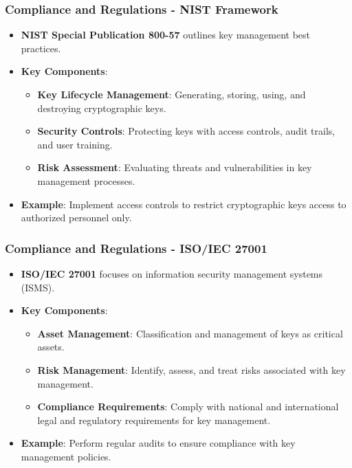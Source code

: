 \documentclass{beamer}
\begin{document}
\begin{frame}[fragile]
    \frametitle{Compliance and Regulations - NIST Framework}
    \begin{itemize}
        \item \textbf{NIST Special Publication 800-57} outlines key management best practices.
        \item \textbf{Key Components}:
        \begin{itemize}
            \item \textbf{Key Lifecycle Management}: Generating, storing, using, and destroying cryptographic keys.
            \item \textbf{Security Controls}: Protecting keys with access controls, audit trails, and user training.
            \item \textbf{Risk Assessment}: Evaluating threats and vulnerabilities in key management processes.
        \end{itemize}
        \item \textbf{Example}: Implement access controls to restrict cryptographic keys access to authorized personnel only.
    \end{itemize}
\end{frame}

\begin{frame}[fragile]
    \frametitle{Compliance and Regulations - ISO/IEC 27001}
    \begin{itemize}
        \item \textbf{ISO/IEC 27001} focuses on information security management systems (ISMS).
        \item \textbf{Key Components}:
        \begin{itemize}
            \item \textbf{Asset Management}: Classification and management of keys as critical assets.
            \item \textbf{Risk Management}: Identify, assess, and treat risks associated with key management.
            \item \textbf{Compliance Requirements}: Comply with national and international legal and regulatory requirements for key management.
        \end{itemize}
        \item \textbf{Example}: Perform regular audits to ensure compliance with key management policies.
    \end{itemize}
\end{frame}
\end{document}
